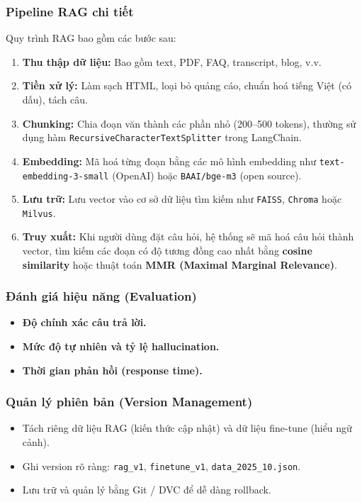 \subsubsection{Pipeline RAG chi tiết}
Quy trình RAG bao gồm các bước sau:
\begin{enumerate}[label=\textbf{(\alph*)}, leftmargin=2cm, itemsep=4pt]
\item \textbf{Thu thập dữ liệu:} Bao gồm text, PDF, FAQ, transcript, blog, v.v.
\item \textbf{Tiền xử lý:} Làm sạch HTML, loại bỏ quảng cáo, chuẩn hoá tiếng Việt (có dấu), tách câu.
\item \textbf{Chunking:} Chia đoạn văn thành các phần nhỏ (200--500 tokens), thường sử dụng hàm \texttt{RecursiveCharacterTextSplitter} trong LangChain.
\item \textbf{Embedding:} Mã hoá từng đoạn bằng các mô hình embedding như \texttt{text-embedding-3-small} (OpenAI) hoặc \texttt{BAAI/bge-m3} (open source).
\item \textbf{Lưu trữ:} Lưu vector vào cơ sở dữ liệu tìm kiếm như \texttt{FAISS}, \texttt{Chroma} hoặc \texttt{Milvus}.
\item \textbf{Truy xuất:} Khi người dùng đặt câu hỏi, hệ thống sẽ mã hoá câu hỏi thành vector, tìm kiếm các đoạn có độ tương đồng cao nhất bằng \textbf{cosine similarity} hoặc thuật toán \textbf{MMR (Maximal Marginal Relevance)}.
\end{enumerate}


\subsubsection{Đánh giá hiệu năng (Evaluation)}
\begin{itemize}
    \item \textbf{Độ chính xác câu trả lời.}
    \item \textbf{Mức độ tự nhiên và tỷ lệ hallucination.}
    \item \textbf{Thời gian phản hồi (response time).}
\end{itemize}

\subsubsection{Quản lý phiên bản (Version Management)}
\begin{itemize}
    \item Tách riêng dữ liệu RAG (kiến thức cập nhật) và dữ liệu fine-tune (hiểu ngữ cảnh).  
    \item Ghi version rõ ràng: \texttt{rag\_v1}, \texttt{finetune\_v1}, \texttt{data\_2025\_10.json}.  
    \item Lưu trữ và quản lý bằng Git / DVC để dễ dàng rollback.  
\end{itemize}

